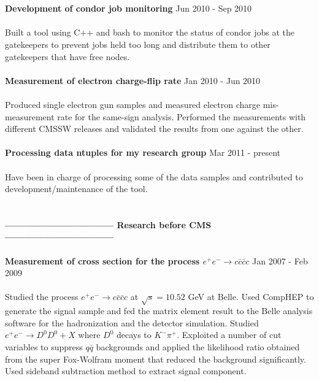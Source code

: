 \documentclass[margin]{res}
\begin{document}
\begin{resume}
     \\
     \\
\textbf{Development of condor job monitoring}
      \hfill{Jun 2010 - Sep 2010} 
     \\
     \\
     Built a tool using C++ and bash to monitor the status of condor jobs at the gatekeepers 
     to prevent jobs held too long and distribute them to other gatekeepers that have 
     free nodes. 
     \\
     \\
\textbf{Measurement of electron charge-flip rate} 
      \hfill Jan 2010 - Jun 2010 
      \\ 
      \\ 
      Produced single electron gun samples and measured electron charge mis-measurement rate 
      for the same-sign analysis. Performed the measurements with different CMSSW releases 
      and validated the results from one against the other.
      \\
      \\
\textbf{Processing data ntuples for my research group} 
      \hfill Mar 2011  - present 
      \\ 
      \\
      Have been in charge of processing some of the data samples and contributed to development/maintenance 
      of the tool. 
      \\
      \\
      \\
\textbf{--------------------------------- 
                Research before CMS 
        ---------------------------------}
     \\
     \\
\textbf{Measurement of cross section for the process $e^+e^- \rightarrow c\bar{c}\bar{c}c$} 
      \hfill Jan 2007 - Feb 2009 
      \\
      \\
      Studied the process $e^+e^- \rightarrow c\bar{c}\bar{c}c$ at $\sqrt{s} = 10.52$ GeV at Belle. 
      Used CompHEP to generate the signal sample and fed the matrix element result to the 
      Belle analysis software for the hadronization and the detector simulation. 
      Studied $e^+e^- \rightarrow D^0D^0+X$ where $D^0$ decays to $K^-\pi^+$.
      Exploited a number of cut variables to suppress $q\bar{q}$ backgrounds 
      and applied the likelihood ratio obtained from the super Fox-Wolfram moment 
      that reduced the background significantly. 
      Used sideband subtraction method to extract signal component. 

\end{resume}
\end{document}
